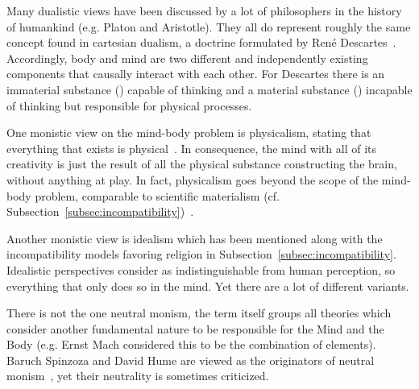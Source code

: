 Many dualistic views have been discussed by a lot of philosophers in the history of humankind (e.g. Platon and Aristotle).
They all do represent roughly the same concept found in cartesian dualism, a doctrine formulated by René Descartes~\cite{Leach2017}.
Accordingly, body and mind are two different and independently existing components that causally interact with each other.
For Descartes there is an immaterial substance () capable of thinking and a material substance () incapable of thinking but responsible for physical processes.


One monistic view on the mind-body problem is physicalism, stating that everything that exists is physical~\cite{stoljar2010physicalism}. In consequence, the mind with all of its creativity is just the result of all the physical substance constructing the brain, without anything  at play.
In fact, physicalism goes beyond the scope of the mind-body problem, comparable to scientific materialism (cf. Subsection~\ref{subsec:incompatibility})~\cite{Crane1990}.

Another monistic view is idealism which has been mentioned along with the incompatibility models favoring religion in Subsection~\ref{subsec:incompatibility}.
Idealistic perspectives consider  as indistinguishable from human perception,
so everything that  only does so in the mind.
Yet there are a lot of different variants.

There is not the one neutral monism, the term itself groups all theories which consider another fundamental nature to be responsible for the Mind and the Body (e.g. Ernst Mach considered this to be the combination of elements).
Baruch Spinzoza and David Hume are viewed as the originators of neutral monism~\cite{rosenkrantz2010historical}, yet their neutrality is sometimes criticized.


